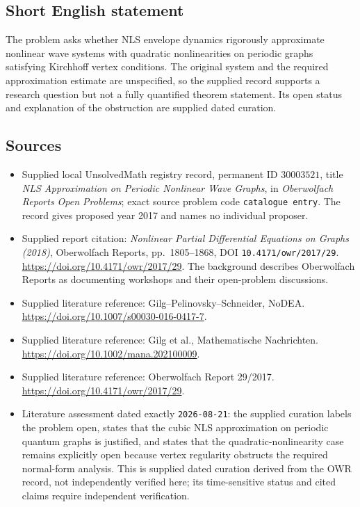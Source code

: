 \documentclass[11pt]{article}
\begin{document}
\subsection{Short English statement}
The problem asks whether NLS envelope dynamics rigorously approximate nonlinear wave systems with quadratic nonlinearities on periodic graphs satisfying Kirchhoff vertex conditions. The original system and the required approximation estimate are unspecified, so the supplied record supports a research question but not a fully quantified theorem statement. Its open status and explanation of the obstruction are supplied dated curation.
\subsection{Sources}
\begin{itemize}
\item Supplied local UnsolvedMath registry record, permanent ID \(30003521\), title \emph{NLS Approximation on Periodic Nonlinear Wave Graphs}, in \emph{Oberwolfach Reports Open Problems}; exact source problem code \texttt{catalogue entry}. The record gives proposed year 2017 and names no individual proposer.
\item Supplied report citation: \emph{Nonlinear Partial Differential Equations on Graphs (2018)}, Oberwolfach Reports, pp.~1805--1868, DOI \texttt{10.4171/owr/2017/29}. \url{https://doi.org/10.4171/owr/2017/29}. The background describes Oberwolfach Reports as documenting workshops and their open-problem discussions.
\item Supplied literature reference: Gilg--Pelinovsky--Schneider, NoDEA. \url{https://doi.org/10.1007/s00030-016-0417-7}.
\item Supplied literature reference: Gilg et al., Mathematische Nachrichten. \url{https://doi.org/10.1002/mana.202100009}.
\item Supplied literature reference: Oberwolfach Report 29/2017. \url{https://doi.org/10.4171/owr/2017/29}.
\item Literature assessment dated exactly \texttt{2026-08-21}: the supplied curation labels the problem open, states that the cubic NLS approximation on periodic quantum graphs is justified, and states that the quadratic-nonlinearity case remains explicitly open because vertex regularity obstructs the required normal-form analysis. This is supplied dated curation derived from the OWR record, not independently verified here; its time-sensitive status and cited claims require independent verification.
\end{itemize}
\end{document}
